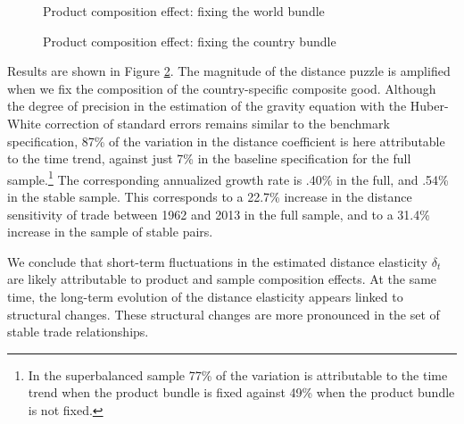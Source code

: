 \documentclass[12pt,twoside,a4paper,notitlepage]{article}
\begin{document}
\begin{figure}[H]
	\caption{Product composition effect: fixing the world bundle  \label{fig:compworld}}
	\begin{center}
		\setlength{\fboxrule}{1pt} %
		\setlength{\fboxsep}{.1in} %
	\end{center}
\end{figure}

\begin{figure}[h!]
\caption{Product composition effect: fixing the country bundle  \label{fig:compbundle}}
\begin{center}
\setlength{\fboxrule}{1pt} %
\setlength{\fboxsep}{.1in} %
\end{center}
\end{figure}

Results are shown in Figure \ref{fig:compbundle}. The magnitude of the distance puzzle is amplified when we fix the composition of the country-specific composite good.
Although the degree of precision in the estimation of the gravity equation with the Huber-White correction of standard errors remains similar to the benchmark specification, 87\% of the variation in the distance coefficient is here attributable to the time trend, against just 7\% in the baseline specification for the full sample.\footnote{In the superbalanced sample 77\% of the variation is attributable to the time trend when the product bundle is fixed against 49\% when the product bundle is not fixed.}
The corresponding annualized growth rate is .40\% in the full, and .54\% in the stable sample.
This corresponds to a 22.7\% increase in the distance sensitivity of trade between 1962 and 2013 in the full sample, and to a 31.4\% increase in the sample of stable pairs.

We conclude that short-term fluctuations in the estimated distance elasticity $\delta_t$ are likely attributable to product and sample composition effects.
At the same time, the long-term evolution of the distance elasticity appears linked to structural changes.
These structural changes are more pronounced in the set of stable trade relationships.
\end{document}
